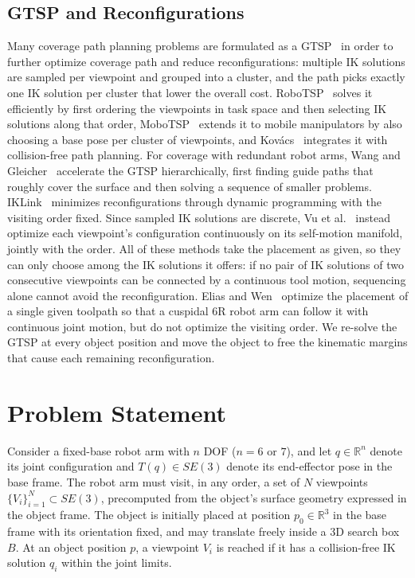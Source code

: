 \documentclass[letterpaper, journal, twoside]{IEEEtran}
\begin{document}
\subsection{GTSP and Reconfigurations}
Many coverage path planning problems are formulated as a GTSP~\cite{alatartsev2015survey} in order to further optimize coverage path and reduce reconfigurations: multiple IK solutions are sampled per viewpoint and grouped into a cluster, and the path picks exactly one IK solution per cluster that lower the overall cost. RoboTSP~\cite{suarezruiz2017robotsp} solves it efficiently by first ordering the viewpoints in task space and then selecting IK solutions along that order, MoboTSP~\cite{mobotsp2020} extends it to mobile manipulators by also choosing a base pose per cluster of viewpoints, and Kov\'acs~\cite{kovacs2016} integrates it with collision-free path planning. For coverage with redundant robot arms, Wang and Gleicher~\cite{wang2025hierarchical} accelerate the GTSP hierarchically, first finding guide paths that roughly cover the surface and then solving a sequence of smaller problems. IKLink~\cite{wang2024iklink} minimizes reconfigurations through dynamic programming with the visiting order fixed. Since sampled IK solutions are discrete, Vu et al.~\cite{vu2026coupled} instead optimize each viewpoint's configuration continuously on its self-motion manifold, jointly with the order. All of these methods take the placement as given, so they can only choose among the IK solutions it offers: if no pair of IK solutions of two consecutive viewpoints can be connected by a continuous tool motion, sequencing alone cannot avoid the reconfiguration. Elias and Wen~\cite{elias2025cuspidal} optimize the placement of a single given toolpath so that a cuspidal 6R robot arm can follow it with continuous joint motion, but do not optimize the visiting order. We re-solve the GTSP at every object position and move the object to free the kinematic margins that cause each remaining reconfiguration.

\section{Problem Statement}
\label{sec:problem}
Consider a fixed-base robot arm with $n$ DOF ($n = 6$ or $7$), and let $q \in \mathbb{R}^n$ denote its joint configuration and $T(q) \in SE(3)$ denote its end-effector pose in the base frame. The robot arm must visit, in any order, a set of $N$ viewpoints $\{V_i\}_{i=1}^{N} \subset SE(3)$, precomputed from the object's surface geometry expressed in the object frame. The object is initially placed at position $p_0 \in \mathbb{R}^3$ in the base frame with its orientation fixed, and may translate freely inside a 3D search box $B$. At an object position $p$, a viewpoint $V_i$ is reached if it has a collision-free IK solution $q_i$ within the joint limits.
\end{document}

